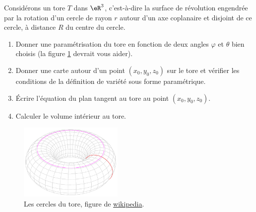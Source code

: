 
\begin{exercice}\label{exoTP20090003}


Considérons un tore $T$ dans $\eR^3$, c’est-à-dire la surface de révolution engendrée par la rotation d’un cercle de rayon $r$ autour d’un axe coplanaire et disjoint de ce cercle, à distance $R$ du centre du cercle.
\begin{enumerate}

	\item
		Donner une paramétrisation du tore en fonction de deux angles $\varphi$ et $\theta$ bien choisis (la figure \ref{FigToreWiki} devrait vous aider).
	\item
		Donner une carte autour d’un point $(x_0 , y_0 , z_0 )$ sur le tore et vérifier les conditions de la définition de variété sous forme paramétrique.
	\item
		Écrire l'équation du plan tangent au tore au point $(x_0 , y_0 , z_0 )$.
	\item
		Calculer le volume intérieur au tore.

\end{enumerate}

\begin{figure}
	\includegraphics[width=5cm]{Torus_cycles.png}
	\caption{Les cercles du tore, figure de \href{http://fr.wikipedia.org/wiki/Tore}{wikipedia}.}\label{FigToreWiki}
\end{figure}

\end{exercice}
